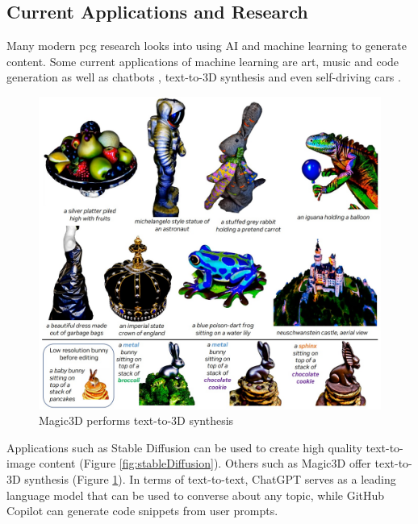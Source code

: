 \subsection{Current Applications and Research}
Many modern \acrshort{pcg} research looks into using AI and machine learning to generate content. Some current applications of machine learning are art, music and code generation as well as chatbots \cite{AIGC_Survey}, text-to-3D synthesis \cite{Magic3D} and even self-driving cars \cite{Self_Driving_Cars}.

\begin{figure}[H]
    \centering
    \includegraphics[width=\textwidth, height=0.4\textheight, keepaspectratio]{Images/Magic3D.jpg}
    \caption{Magic3D performs text-to-3D synthesis \cite{Magic3D}}
    \label{fig:magic3D}
\end{figure}

Applications such as Stable Diffusion \cite{Stable_Diffusion} can be used to create high quality text-to-image content (Figure \ref{fig:stableDiffusion}). Others such as Magic3D \cite{Magic3D} offer text-to-3D synthesis (Figure \ref{fig:magic3D}). In terms of text-to-text, ChatGPT \cite{Chat_GPT} serves as a leading language model that can be used to converse about any topic, while GitHub Copilot \cite{GitHub_Copilot} can generate code snippets from user prompts.

